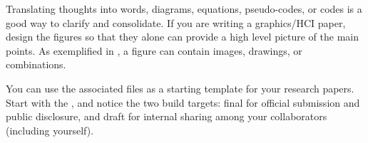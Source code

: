 


Translating thoughts into words, diagrams, equations, pseudo-codes, or codes is a good way to clarify and consolidate.
If you are writing a graphics/HCI paper, design the figures so that they alone can provide a high level picture of the main points.
As exemplified in , a figure can contain images, drawings, or combinations. 


You can use the associated files as a starting template for your research papers.
Start with the , and notice the two build targets: final for official submission and public disclosure, and draft for internal sharing among your collaborators (including yourself).